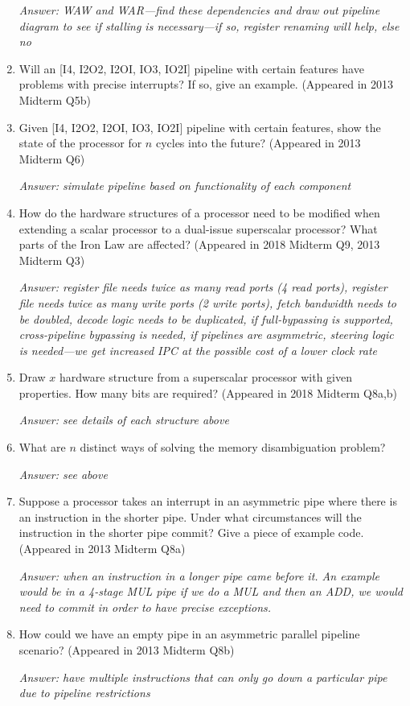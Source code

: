 \documentclass{article}
\begin{document}
\begin{enumerate}
\textit{Answer: WAW and WAR---find these dependencies and draw out pipeline diagram to see if stalling is necessary---if so, register renaming will help, else no}

\item Will an [I4, I2O2, I2OI, IO3, IO2I] pipeline with certain features have problems with precise interrupts? If so, give an example. (Appeared in 2013 Midterm Q5b)

\item Given [I4, I2O2, I2OI, IO3, IO2I] pipeline with certain features, show the state of the processor for $n$ cycles into the future? (Appeared in 2013 Midterm Q6)

\textit{Answer: simulate pipeline based on functionality of each component}

\item How do the hardware structures of a processor need to be modified when extending a scalar processor to a dual-issue superscalar processor? What parts of the Iron Law are affected? (Appeared in 2018 Midterm Q9, 2013 Midterm Q3)

\textit{Answer: register file needs twice as many read ports (4 read ports), register file needs twice as many write ports (2 write ports), fetch bandwidth needs to be doubled, decode logic needs to be duplicated, if full-bypassing is supported, cross-pipeline bypassing is needed, if pipelines are asymmetric, steering logic is needed---we get increased IPC at the possible cost of a lower clock rate}

\item Draw $x$ hardware structure from a superscalar processor with given properties. How many bits are required? (Appeared in 2018 Midterm Q8a,b)

\textit{Answer: see details of each structure above}

\item What are $n$ distinct ways of solving the memory disambiguation problem?

\textit{Answer: see above}

\item Suppose a processor takes an interrupt in an asymmetric pipe where there is an instruction in the shorter pipe. Under what circumstances will the instruction in the shorter pipe commit? Give a piece of example code. (Appeared in 2013 Midterm Q8a)

\textit{Answer: when an instruction in a longer pipe came before it. An example would be in a 4-stage MUL pipe if we do a MUL and then an ADD, we would need to commit in order to have precise exceptions.}

\item How could we have an empty pipe in an asymmetric parallel pipeline scenario? (Appeared in 2013 Midterm Q8b)

\textit{Answer: have multiple instructions that can only go down a particular pipe due to pipeline restrictions}
\end{enumerate}
\end{document}
